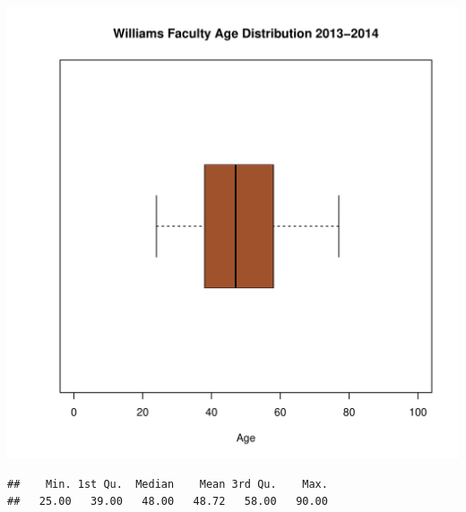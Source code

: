\documentclass[12pt,a4paper]{article}\usepackage[]{graphicx}\usepackage[]{color}
\makeatletter
\def\maxwidth{ %
  \ifdim\Gin@nat@width>\linewidth
    \linewidth
  \else
    \Gin@nat@width
  \fi
}
\newenvironment{kframe}{%
 \def\at@end@of@kframe{}%
 \ifinner\ifhmode%
  \def\at@end@of@kframe{\end{minipage}}%
  \begin{minipage}{\columnwidth}%
 \fi\fi%
 \def\FrameCommand##1{\hskip\@totalleftmargin \hskip-\fboxsep
 \colorbox{shadecolor}{##1}\hskip-\fboxsep
     \hskip-\linewidth \hskip-\@totalleftmargin \hskip\columnwidth}%
 \MakeFramed {\advance\hsize-\width
   \@totalleftmargin\z@ \linewidth\hsize
   \@setminipage}}%
 {\par\unskip\endMakeFramed%
 \at@end@of@kframe}
\newenvironment{knitrout}{}{} %
\theoremstyle{definition}
\makeatother
\begin{document}
\begin{knitrout}
\color{fgcolor}
\includegraphics[width=\maxwidth]{figure/unnamed-chunk-40-1} 

\end{knitrout}

\begin{knitrout}
\color{fgcolor}\begin{kframe}
\begin{verbatim}
##    Min. 1st Qu.  Median    Mean 3rd Qu.    Max. 
##   25.00   39.00   48.00   48.72   58.00   90.00
\end{verbatim}
\end{kframe}
\end{knitrout}
\end{document}

